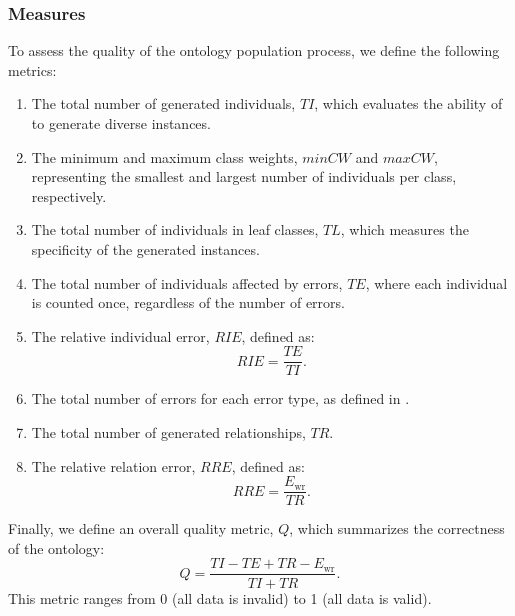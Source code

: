 %
\subsubsection{Measures}
\label{subsubsec:measures}

To assess the quality of the ontology population process, we define the following metrics:

%
\begin{enumerate}
    \item The total number of generated individuals, \(\mathit{TI}\), which evaluates the ability of \llmfkg{} to generate diverse instances.
    \item The minimum and maximum class weights, \(\mathit{minCW}\) and \(\mathit{maxCW}\), representing the smallest and largest number of individuals per class, respectively.
    \item The total number of individuals in leaf classes, \(\mathit{TL}\), which measures the specificity of the generated instances.
    \item The total number of individuals affected by errors, \(\mathit{TE}\), where each individual is counted once, regardless of the number of errors.
    \item The relative individual error, \(\mathit{RIE}\), defined as:
    \begin{equation}
        \label{eq:relative_individual_error}
        \mathit{RIE} = \frac{\mathit{TE}}{\mathit{TI}}.
    \end{equation}
    \item The total number of errors for each error type, as defined in .
    \item The total number of generated relationships, \(\mathit{TR}\).
    \item The relative relation error, \(\mathit{RRE}\), defined as:
    \begin{equation}
        \label{eq:relative_relation_error}
        \mathit{RRE} = \frac{E_{\text{wr}}}{\mathit{TR}}.
    \end{equation}
\end{enumerate}

%
Finally, we define an overall quality metric, \(Q\), which summarizes the correctness of the ontology:
%
\begin{equation}
    \label{eq:quality_metric}
    Q = \frac{\mathit{TI} - \mathit{TE} + \mathit{TR} - E_{\text{wr}}}{\mathit{TI} + \mathit{TR}}.
\end{equation}
%
This metric ranges from 0 (all data is invalid) to 1 (all data is valid).

